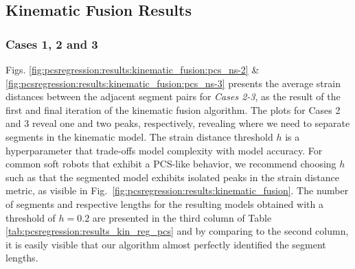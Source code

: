 \subsection{Kinematic Fusion Results}
\subsubsection{Cases 1, 2 and 3}
Figs. \ref{fig:pcsregression:results:kinematic_fusion:pcs_ns-2} \& \ref{fig:pcsregression:results:kinematic_fusion:pcs_ns-3} presents the average strain distances between the adjacent segment pairs for \emph{Cases 2-3}, as the result of the first and final iteration of the kinematic fusion algorithm. 
The plots for Cases 2 and 3 reveal one and two peaks, respectively, revealing where we need to separate segments in the kinematic model.
The strain distance threshold $h$ is a hyperparameter that trade-offs model complexity with model accuracy.
For common soft robots that exhibit a \gls{PCS}-like behavior, we recommend choosing $h$ such as that the segmented model exhibits isolated peaks in the strain distance metric, as visible in Fig.~\ref{fig:pcsregression:results:kinematic_fusion}.
The number of segments and respective lengths for the resulting models obtained with a threshold of $h=0.2$ are presented in the third column of Table \ref{tab:pcsregression:results_kin_reg_pcs} and by comparing to the second column, it is easily visible that our algorithm almost perfectly identified the segment lengths. 
%
